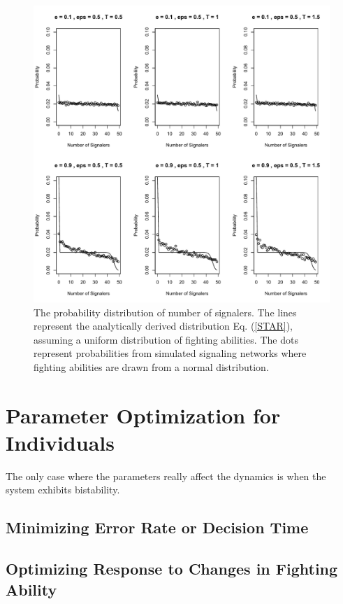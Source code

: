 \documentclass{article}
\begin{document}
\begin{figure}
\includegraphics[width=6in]{distributions_of_signals_received.pdf}
\caption{The probability distribution of number of signalers.  The lines represent the analytically derived distribution Eq. (\ref{STAR}), assuming a uniform distribution of fighting abilities.  The dots represent probabilities from simulated signaling networks where fighting abilities are drawn from a normal distribution. \label{derived_sig_probs}}
\end{figure}

\section{Parameter Optimization for Individuals }
The only case where the parameters really affect the dynamics is when the system exhibits bistability.

\subsection{Minimizing Error Rate or Decision Time }

\subsection{Optimizing Response to Changes in Fighting Ability }
\end{document}
